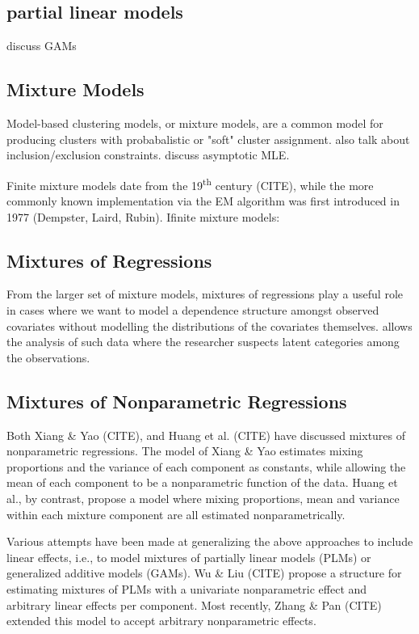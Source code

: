 \documentclass[fleqn,10pt]{olplainarticle}\usepackage[]{graphicx}\usepackage[]{color}
\begin{document}
\subsection{partial linear models}

discuss GAMs

\subsection{Mixture Models}

Model-based clustering models, or mixture models, are a common model for producing clusters with probabalistic or "soft" cluster assignment. 
also talk about inclusion/exclusion constraints.
discuss asymptotic MLE.

Finite mixture models date from the 19\textsuperscript{th} century (CITE), while the more commonly known implementation via the EM algorithm was first introduced in 1977 (Dempster, Laird, Rubin).
Ifinite mixture models: \cite{infinte}

\subsection{Mixtures of Regressions}

From the larger set of mixture models, mixtures of regressions play a useful role in cases where we want to model a dependence structure amongst observed covariates without modelling the distributions of the covariates themselves. 
allows the analysis of such data where the researcher suspects latent categories among the observations. 


\subsection{Mixtures of Nonparametric Regressions}

Both Xiang \& Yao (CITE), and Huang et al. (CITE) have discussed mixtures of nonparametric regressions. The model of Xiang \& Yao estimates mixing proportions and the variance of each component as constants, while allowing the mean of each component to be a nonparametric function of the data. Huang et al., by contrast, propose a model where mixing proportions, mean and variance within each mixture component are all estimated nonparametrically.

Various attempts have been made at generalizing the above approaches to include linear effects, i.e., to model mixtures of partially linear models (PLMs) or generalized additive models (GAMs). Wu \& Liu (CITE) propose a structure for estimating mixtures of PLMs with a univariate nonparametric effect and arbitrary linear effects per component. Most recently, Zhang \& Pan (CITE) extended this model to accept arbitrary nonparametric effects.
\end{document}
